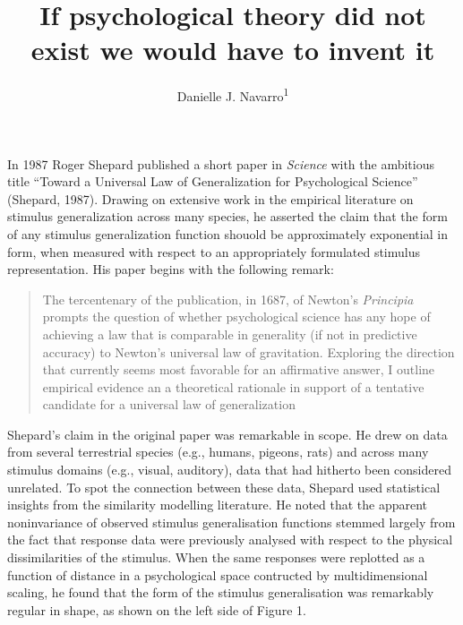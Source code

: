 \documentclass[doc]{apa6}
\affiliation{
\vspace{0.5cm}
\textsuperscript{1} School of Psychology, University of New South Wales}
\title{If psychological theory did not exist we would have to invent it}
\author{Danielle J. Navarro\textsuperscript{1}}
\date{}
\begin{document}
\maketitle

In 1987 Roger Shepard published a short paper in \emph{Science} with the ambitious title \enquote{Toward a Universal Law of Generalization for Psychological Science} (Shepard, 1987). Drawing on extensive work in the empirical literature on stimulus generalization across many species, he asserted the claim that the form of any stimulus generalization function shouold be approximately exponential in form, when measured with respect to an appropriately formulated stimulus representation. His paper begins with the following remark:

\begin{quote}
The tercentenary of the publication, in 1687, of Newton's \emph{Principia} prompts the question of whether psychological science has any hope of achieving a law that is comparable in generality (if not in predictive accuracy) to Newton's universal law of gravitation. Exploring the direction that currently seems most favorable for an affirmative answer, I outline empirical evidence an a theoretical rationale in support of a tentative candidate for a universal law of generalization
\end{quote}

Shepard's claim in the original paper was remarkable in scope. He drew on data from several terrestrial species (e.g., humans, pigeons, rats) and across many stimulus domains (e.g., visual, auditory), data that had hitherto been considered unrelated. To spot the connection between these data, Shepard used statistical insights from the similarity modelling literature. He noted that the apparent noninvariance of observed stimulus generalisation functions stemmed largely from the fact that response data were previously analysed with respect to the physical dissimilarities of the stimulus. When the same responses were replotted as a function of distance in a psychological space contructed by multidimensional scaling, he found that the form of the stimulus generalisation was remarkably regular in shape, as shown on the left side of Figure 1.
\end{document}
